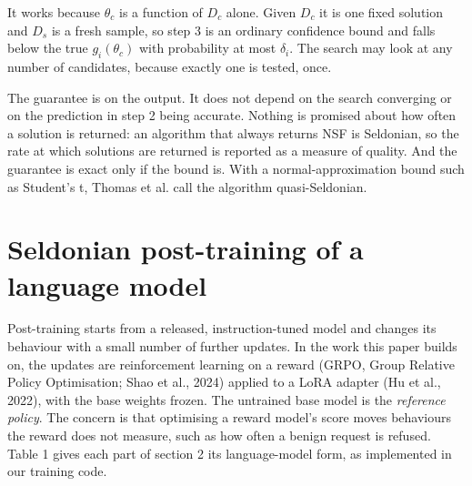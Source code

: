 \documentclass[11pt]{article}
\begin{document}
It works because $\theta_{c}$ is a function of $D_{c}$ alone. Given $D_{c}$ it is one fixed solution and $D_{s}$ is a fresh sample, so step 3 is an ordinary confidence bound and falls below the true $g_{i} (\theta_{c} )$ with probability at most $\delta_{i}$. The search may look at any number of candidates, because exactly one is tested, once.


The guarantee is on the output. It does not depend on the search converging or on the prediction in step 2 being accurate. Nothing is promised about how often a solution is returned: an algorithm that always returns NSF is Seldonian, so the rate at which solutions are returned is reported as a measure of quality. And the guarantee is exact only if the bound is. With a normal-approximation bound such as Student's t, Thomas et al. call the algorithm quasi-Seldonian.


\section{Seldonian post-training of a language model}

Post-training starts from a released, instruction-tuned model and changes its behaviour with a small number of further updates. In the work this paper builds on, the updates are reinforcement learning on a reward (GRPO, Group Relative Policy Optimisation; Shao et al., 2024) applied to a LoRA adapter (Hu et al., 2022), with the base weights frozen. The untrained base model is the \emph{reference policy}. The concern is that optimising a reward model's score moves behaviours the reward does not measure, such as how often a benign request is refused. Table 1 gives each part of section 2 its language-model form, as implemented in our training code.
\end{document}
